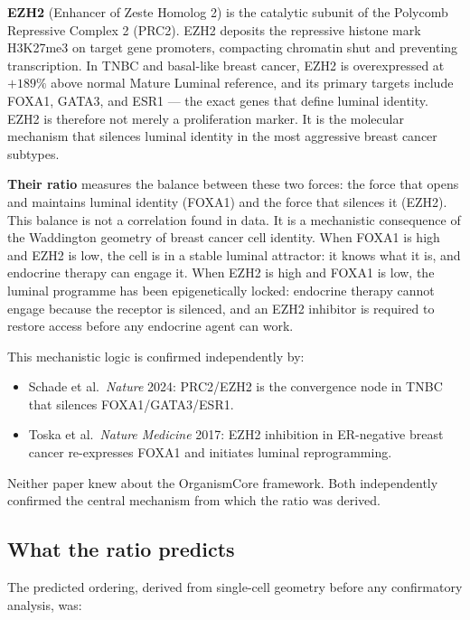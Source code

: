 \documentclass[12pt, a4paper]{article}
\begin{document}
\textbf{EZH2} (Enhancer of Zeste Homolog 2) is the catalytic
subunit of the Polycomb Repressive Complex 2 (PRC2). EZH2
deposits the repressive histone mark H3K27me3 on target
gene promoters, compacting chromatin shut and preventing
transcription. In TNBC and basal-like breast cancer, EZH2 is
overexpressed at $+189\%$ above normal Mature Luminal
reference, and its primary targets include FOXA1, GATA3, and
ESR1 --- the exact genes that define luminal identity.
EZH2 is therefore not merely a proliferation marker. It is
the molecular mechanism that silences luminal identity in
the most aggressive breast cancer subtypes.

\textbf{Their ratio} measures the balance between these two
forces: the force that opens and maintains luminal identity
(FOXA1) and the force that silences it (EZH2). This balance
is not a correlation found in data. It is a mechanistic
consequence of the Waddington geometry of breast cancer
cell identity. When FOXA1 is high and EZH2 is low, the cell
is in a stable luminal attractor: it knows what it is, and
endocrine therapy can engage it. When EZH2 is high and
FOXA1 is low, the luminal programme has been epigenetically
locked: endocrine therapy cannot engage because the receptor
is silenced, and an EZH2 inhibitor is required to restore
access before any endocrine agent can work.

This mechanistic logic is confirmed independently by:
\begin{itemize}[noitemsep]
  \item Schade et al.\ \textit{Nature} 2024: PRC2/EZH2
        is the convergence node in TNBC that silences
        FOXA1/GATA3/ESR1.
  \item Toska et al.\ \textit{Nature Medicine} 2017:
        EZH2 inhibition in ER-negative breast cancer
        re-expresses FOXA1 and initiates luminal
        reprogramming.
\end{itemize}

Neither paper knew about the OrganismCore framework. Both
independently confirmed the central mechanism from which the
ratio was derived.

\subsection{What the ratio predicts}

The predicted ordering, derived from single-cell geometry
before any confirmatory analysis, was:
\end{document}
